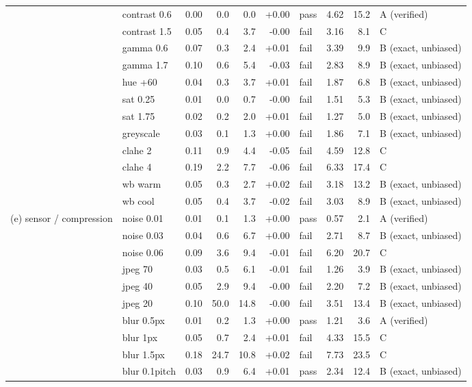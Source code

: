 \begin{tabular}{llrrrrlrrl}
 & contrast 0.6 & 0.00 & 0.0 & 0.0 & +0.00 & pass & 4.62 & 15.2 & A (verified) \\
 & contrast 1.5 & 0.05 & 0.4 & 3.7 & -0.00 & fail & 3.16 & 8.1 & C \\
 & gamma 0.6 & 0.07 & 0.3 & 2.4 & +0.01 & fail & 3.39 & 9.9 & B (exact, unbiased) \\
 & gamma 1.7 & 0.10 & 0.6 & 5.4 & -0.03 & fail & 2.83 & 8.9 & B (exact, unbiased) \\
 & hue +60 & 0.04 & 0.3 & 3.7 & +0.01 & fail & 1.87 & 6.8 & B (exact, unbiased) \\
 & sat 0.25 & 0.01 & 0.0 & 0.7 & -0.00 & fail & 1.51 & 5.3 & B (exact, unbiased) \\
 & sat 1.75 & 0.02 & 0.2 & 2.0 & +0.01 & fail & 1.27 & 5.0 & B (exact, unbiased) \\
 & greyscale & 0.03 & 0.1 & 1.3 & +0.00 & fail & 1.86 & 7.1 & B (exact, unbiased) \\
 & clahe 2 & 0.11 & 0.9 & 4.4 & -0.05 & fail & 4.59 & 12.8 & C \\
 & clahe 4 & 0.19 & 2.2 & 7.7 & -0.06 & fail & 6.33 & 17.4 & C \\
 & wb warm & 0.05 & 0.3 & 2.7 & +0.02 & fail & 3.18 & 13.2 & B (exact, unbiased) \\
 & wb cool & 0.05 & 0.4 & 3.7 & -0.02 & fail & 3.03 & 8.9 & B (exact, unbiased) \\
(e) sensor / compression & noise 0.01 & 0.01 & 0.1 & 1.3 & +0.00 & pass & 0.57 & 2.1 & A (verified) \\
 & noise 0.03 & 0.04 & 0.6 & 6.7 & +0.00 & fail & 2.71 & 8.7 & B (exact, unbiased) \\
 & noise 0.06 & 0.09 & 3.6 & 9.4 & -0.01 & fail & 6.20 & 20.7 & C \\
 & jpeg 70 & 0.03 & 0.5 & 6.1 & -0.01 & fail & 1.26 & 3.9 & B (exact, unbiased) \\
 & jpeg 40 & 0.05 & 2.9 & 9.4 & -0.00 & fail & 2.20 & 7.2 & B (exact, unbiased) \\
 & jpeg 20 & 0.10 & 50.0 & 14.8 & -0.00 & fail & 3.51 & 13.4 & B (exact, unbiased) \\
 & blur 0.5px & 0.01 & 0.2 & 1.3 & +0.00 & pass & 1.21 & 3.6 & A (verified) \\
 & blur 1px & 0.05 & 0.7 & 2.4 & +0.01 & fail & 4.33 & 15.5 & C \\
 & blur 1.5px & 0.18 & 24.7 & 10.8 & +0.02 & fail & 7.73 & 23.5 & C \\
 & blur 0.1pitch & 0.03 & 0.9 & 6.4 & +0.01 & pass & 2.34 & 12.4 & B (exact, unbiased) \\

\end{tabular}
